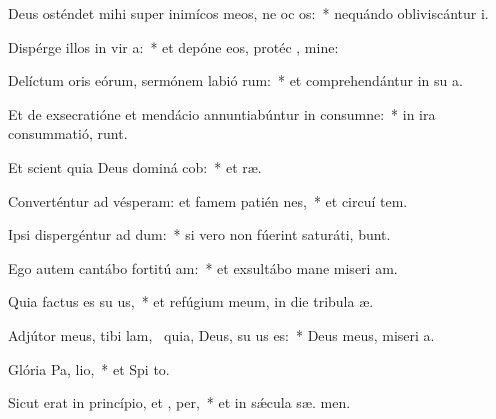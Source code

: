 \item Deus osténdet mihi super inimícos meos, ne oc os:~* nequándo obliviscántur  i.
\item Dispérge illos in vir a:~* et depóne eos, protéc , mine:
\item Delíctum oris eórum, sermónem labió rum:~* et comprehendántur in su a.
\item Et de exsecratióne et mendácio annuntiabúntur in consumne:~* in ira consummatió,   runt.
\item Et scient quia Deus dominá cob:~* et  ræ.
\item Converténtur ad vésperam: et famem patién  nes,~* et circuí tem.
\item Ipsi dispergéntur ad dum:~* si vero non fúerint saturáti,  bunt.
\item Ego autem cantábo fortitú am:~* et exsultábo mane miseri am.
\item Quia factus es su us,~* et refúgium meum, in die tribula æ.
\item Adjútor meus, tibi lam,~\pscross{} quia, Deus, su us es:~* Deus meus, miseri a.
\item Glória Pa,  lio,~* et Spi to.
\item Sicut erat in princípio, et ,  per,~* et in sǽcula sæ. men.
